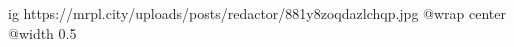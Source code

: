  
 
 
 
 

\ifcmt
  ig https://mrpl.city/uploads/posts/redactor/881y8zoqdazlchqp.jpg
  @wrap center
  @width 0.5
\fi
